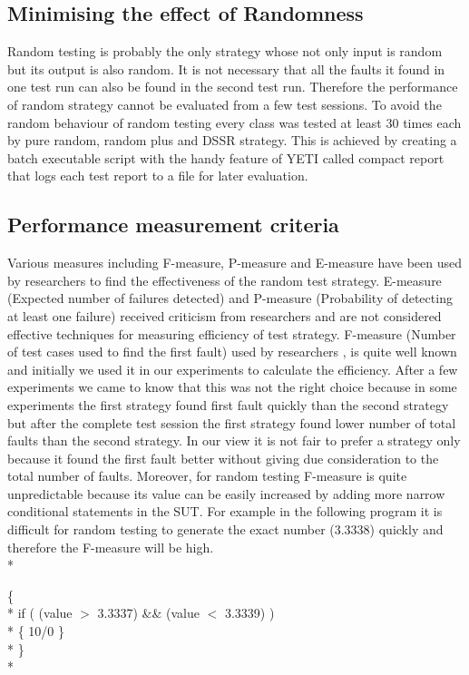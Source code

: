 \documentclass[conference]{IEEEtran}
\begin{document}
\subsection{Minimising the effect of Randomness}
\indent Random testing is probably the only strategy whose not only input is random but its output is also random. It is not necessary that all the faults it found in one test run can also be found in the second test run. Therefore the performance of random strategy cannot be evaluated from a few test sessions. To avoid the random behaviour of random testing every class was tested at least 30 times each by pure random, random plus and DSSR strategy. This is achieved by creating a batch executable script with the handy feature of YETI called compact report that logs each test report to a file for later evaluation.

\subsection{Performance measurement criteria}
Various measures including F-measure, P-measure and E-measure have been used by researchers to find the effectiveness of the random test strategy. E-measure (Expected number of failures detected) and P-measure (Probability of detecting at least one failure) received criticism from researchers \cite{Chen2008} and are not considered effective techniques for measuring efficiency of test strategy. F-measure (Number of test cases used to find the first fault) used by researchers  \cite{Chen1996}, \cite{Chen2004} is quite well known and initially we used it in our experiments to calculate the efficiency. After a few experiments we came to know that this was not the right choice because in some experiments the first strategy found first fault quickly than the second strategy but after the complete test session the first strategy found lower number of total faults than the second strategy. In our view it is not fair to prefer a strategy only because it found the first fault better without giving due consideration to the total number of faults. Moreover, for random testing F-measure is quite unpredictable because its value can be easily increased by adding more narrow conditional statements in the SUT. For example in the following program it is difficult for random testing to generate the exact number (3.3338) quickly and therefore the F-measure will be high.\\*

\begingroup
    \fontsize{7pt}{8pt}\selectfont
\noindent
\{ \\*
\indent if ( (value $>$  3.3337) \&\& (value $<$ 3.3339) )\\*
\indent \{ 10/0 \} \\* 
\} \\*
\endgroup
  
\end{document}
